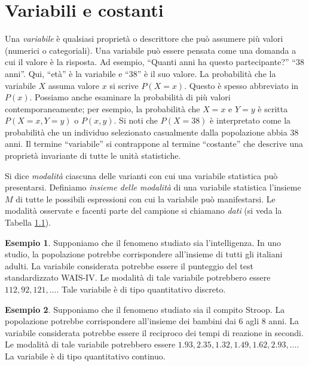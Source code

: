 \documentclass[
]{book}
\theoremstyle{definition}
\theoremstyle{definition}
\newtheorem{example}{Esempio}
\theoremstyle{definition}
\theoremstyle{definition}
\theoremstyle{remark}
\begin{document}
\hypertarget{variabili-e-costanti}{%
\section{Variabili e costanti}\label{variabili-e-costanti}}

Una \emph{variabile} è qualsiasi proprietà o descrittore che può assumere più valori (numerici o categoriali). Una variabile può essere pensata come una domanda a cui il valore è la risposta. Ad esempio, ``Quanti anni ha questo partecipante?'' ``38 anni''. Qui, ``età'' è la variabile e ``38'' è il suo valore. La probabilità che la variabile \(X\) assuma valore \(x\) si scrive \(P(X = x)\). Questo è spesso abbreviato in \(P(x)\). Possiamo anche esaminare la probabilità di più valori contemporaneamente; per esempio, la probabilità che \(X = x\) e \(Y = y\) è scritta \(P(X = x, Y = y)\) o \(P(x, y)\). Si noti che \(P(X = 38)\) è interpretato come la probabilità che un individuo selezionato casualmente dalla popolazione abbia 38 anni. Il termine ``variabile'' si contrappone al termine ``costante'' che descrive una proprietà invariante di tutte le unità statistiche.

Si dice \emph{modalità} ciascuna delle varianti con cui una variabile statistica può presentarsi. Definiamo \emph{insieme delle modalità} di una variabile statistica l'insieme \(M\) di tutte le possibili espressioni con cui la variabile può manifestarsi. Le modalità osservate e facenti parte del campione si chiamano \emph{dati} (si veda la Tabella \protect\hyperlink{tab:term_st_desc}{1.1}).

\begin{example}
Supponiamo che il fenomeno studiato sia l'intelligenza. In uno studio, la popolazione potrebbe corrispondere all'insieme di tutti gli italiani adulti. La variabile considerata potrebbe essere il punteggio del test standardizzato WAIS-IV. Le modalità di tale variabile potrebbero essere \(112, 92, 121, \dots\). Tale variabile è di tipo quantitativo discreto.
\end{example}

\begin{example}
Supponiamo che il fenomeno studiato sia il compito Stroop. La popolazione potrebbe corrispondere all'insieme dei bambini dai 6 agli 8 anni. La variabile considerata potrebbe essere il reciproco dei tempi di reazione in secondi. Le modalità di tale variabile potrebbero essere \(1.93, 2.35, 1.32, 1.49, 1.62, 2.93, \dots\). La variabile è di tipo quantitativo continuo.
\end{example}
\end{document}
